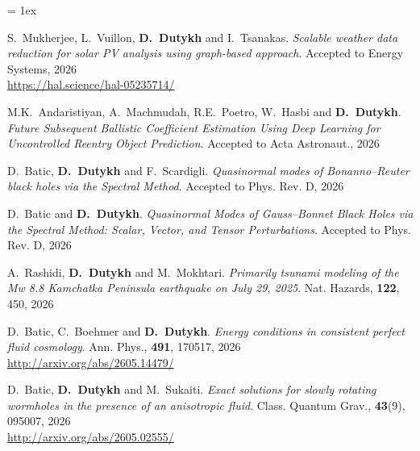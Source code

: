 \documentclass[final, a4paper, oneside, 12pt]{article}
\numberwithin{equation}{section}
\begin{document}
\listpartsep = 1ex

\begin{etaremune}



  \item S.~Mukherjee, L.~Vuillon, \textbf{D.~Dutykh} and I.~Tsanakas. \textit{Scalable weather data reduction for solar PV analysis using graph-based approach}. Accepted to Energy Systems, 2026 \\ %
  \url{https://hal.science/hal-05235714/}

  \item M.K.~Andaristiyan, A.~Machmudah, R.E.~Poetro, W.~Hasbi and \textbf{D.~Dutykh}. \textit{Future Subsequent Ballistic Coefficient Estimation Using Deep Learning for Uncontrolled Reentry Object Prediction}. Accepted to Acta Astronaut., 2026 %

  \item D.~Batic, \textbf{D.~Dutykh} and F.~Scardigli. \textit{Quasinormal modes of Bonanno--Reuter black holes via the Spectral Method}. Accepted to Phys. Rev. D, 2026 %

  \item D.~Batic and \textbf{D.~Dutykh}. \textit{Quasinormal Modes of Gauss--Bonnet Black Holes via the Spectral Method: Scalar, Vector, and Tensor Perturbations}. Accepted to Phys. Rev. D, 2026 %

  \item A.~Rashidi, \textbf{D.~Dutykh} and M.~Mokhtari. \textit{Primarily tsunami modeling of the Mw 8.8 Kamchatka Peninsula earthquake on July 29, 2025}. Nat. Hazards, \textbf{122}, 450, 2026 %
  
  \item D.~Batic, C.~Boehmer and \textbf{D.~Dutykh}. \textit{Energy conditions in consistent perfect fluid cosmology}. Ann. Phys., \textbf{491}, 170517, 2026 \\ %
  \url{http://arxiv.org/abs/2605.14479/}
  
  \item D.~Batic, \textbf{D.~Dutykh} and M.~Sukaiti. \textit{Exact solutions for slowly rotating wormholes in the presence of an anisotropic fluid}. Class. Quantum Grav., \textbf{43}(9), 095007, 2026 \\ %
  \url{http://arxiv.org/abs/2605.02555/}


\end{etaremune}
\end{document}
